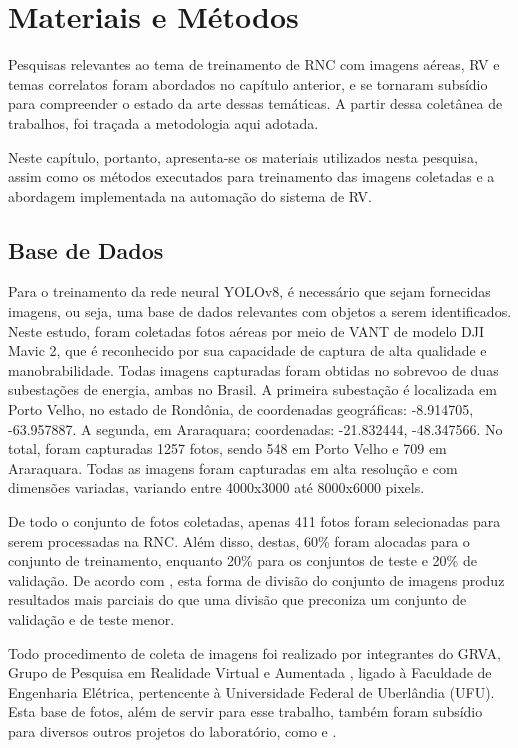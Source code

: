 \chapter{Materiais e Métodos}


Pesquisas relevantes ao tema de treinamento de RNC com imagens aéreas, RV e temas correlatos foram abordados no capítulo anterior, e se tornaram subsídio para compreender o estado da arte dessas temáticas. A partir dessa coletânea de trabalhos, foi traçada a metodologia aqui adotada.

Neste capítulo, portanto, apresenta-se os materiais utilizados nesta pesquisa, assim como os métodos executados para treinamento das imagens coletadas e a abordagem implementada na automação do sistema de RV.

\section{Base de Dados}

Para o treinamento da rede neural YOLOv8, é necessário que sejam fornecidas imagens, ou seja, uma base de dados relevantes com objetos a serem identificados. Neste estudo, foram coletadas fotos aéreas por meio de VANT de modelo DJI Mavic 2, que é reconhecido por sua capacidade de captura de alta qualidade e manobrabilidade. Todas imagens capturadas foram obtidas no sobrevoo de duas subestações de energia, ambas no Brasil. A primeira subestação é localizada em Porto Velho, no estado de Rondônia, de coordenadas geográficas: -8.914705, -63.957887. A segunda, em Araraquara; coordenadas: -21.832444, -48.347566. No total, foram capturadas 1257 fotos, sendo  548 em Porto Velho e 709 em Araraquara. Todas as imagens foram capturadas em alta resolução e com dimensões variadas, variando entre 4000x3000 até 8000x6000 pixels. 

De todo o conjunto de fotos coletadas, apenas 411 fotos foram selecionadas para serem processadas na RNC. Além disso, destas, 60\% foram alocadas para o conjunto de treinamento, enquanto 20\% para os conjuntos de teste e 20\% de validação. De acordo com , esta forma de divisão do conjunto de imagens produz resultados mais parciais do que uma divisão que preconiza um conjunto de validação e de teste menor.

Todo procedimento de coleta de imagens foi realizado por integrantes do GRVA, Grupo de Pesquisa em Realidade Virtual e Aumentada \cite{grva}, ligado à Faculdade de Engenharia Elétrica, pertencente à Universidade Federal de Uberlândia (UFU). Esta base de fotos, além de servir para esse trabalho, também foram subsídio para diversos outros projetos do laboratório, como  e .

